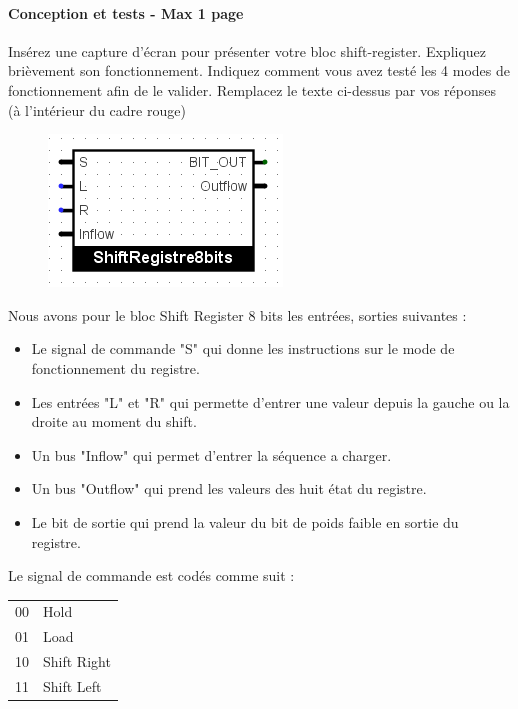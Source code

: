 \documentclass[a4paper]{article} %
\begin{document}
\begin{tcolorbox}[colframe=Monokaimagenta,colback=white, breakable, enhanced]
\paragraph{Conception et tests - Max 1 page}
Insérez une capture d’écran pour présenter votre bloc shift-register. Expliquez brièvement son fonctionnement.
Indiquez comment vous avez testé les 4 modes de fonctionnement afin de le valider.
Remplacez le texte ci-dessus par vos réponses (à l’intérieur du cadre rouge)\\

\begin{figure}[H]
	\centering
	\includegraphics[scale=0.5]{src/SR_8b_bloc}
	\label{fig:SR_8b_bloc}
\end{figure}
Nous avons pour le bloc Shift Register 8 bits les entrées, sorties suivantes : 
\begin{itemize}
	\item Le signal de commande "S" qui donne les instructions sur le mode de fonctionnement du registre.
	\item Les entrées "L" et "R" qui permette d'entrer une valeur depuis la gauche ou la droite au moment du shift.
	\item Un bus "Inflow" qui permet d'entrer la séquence a charger.
	\item Un bus "Outflow" qui prend les valeurs des huit état du registre.
	\item Le bit de sortie qui prend la valeur du bit de poids faible en sortie du registre.
\end{itemize}

Le signal de commande est codés comme suit :
\begin{center}
	\begin{tabular}{c|l}
		00	&	Hold\\
		01	&	Load\\
		10	&	Shift Right\\
		11	&	Shift Left\\
	\end{tabular}
\end{center}


\end{tcolorbox}
\end{document}
